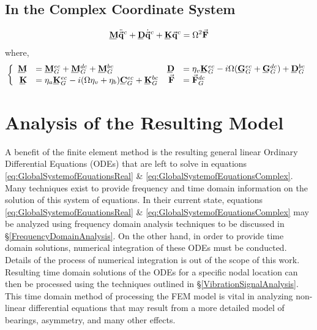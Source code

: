 \subsection{In the Complex Coordinate System}
\begin{equation}\label{eq:GlobalSystemofEquationsComplex}
\bunderline{\mathbf{M}}\ddot{\vec{\mathbf{q}}}^c+\bunderline{\mathbf{D}}\dot{\vec{\mathbf{q}}}^c+\bunderline{\mathbf{K}}\vec{\mathbf{q}}^c=\Omega^2\vec{\mathbf{F}}
\end{equation}
where,
\begin{equation*}
\left\{\begin{array}{rlrl}
\bunderline{\mathbf{M}}&=\bunderline{\mathbf{M}}^{ec}_G+\bunderline{\mathbf{M}}^{dc}_G+\bunderline{\mathbf{M}}^{bc}_G&\bunderline{\mathbf{D}}&=\eta_v\bunderline{\mathbf{K}}^{ec}_G-i\Omega(\bunderline{\mathbf{G}}^{ec}_G+\bunderline{\mathbf{G}}^{dc}_G)+\bunderline{\mathbf{D}}^{bc}_G\\
\bunderline{\mathbf{K}}&=\eta_a\bunderline{\mathbf{K}}^{ec}_G-i(\Omega\eta_v+\eta_b)\bunderline{\mathbf{C}}^{ec}_G+\bunderline{\mathbf{K}}^{bc}_G&\vec{\mathbf{F}}&=\vect{F}^{dc}_G
\end{array}\right.
\end{equation*}
\section{Analysis of the Resulting Model}
A benefit of the finite element method is the resulting general linear Ordinary Differential Equations (ODEs) that are left to solve in equations \eqref{eq:GlobalSystemofEquationsReal} \& \eqref{eq:GlobalSystemofEquationsComplex}. Many techniques exist to provide frequency and time domain information on the solution of this system of equations. In their current state, equations \eqref{eq:GlobalSystemofEquationsReal} \& \eqref{eq:GlobalSystemofEquationsComplex} may be analyzed using frequency domain analysis techniques to be discussed in \S\ref{FrequencyDomainAnalysis}. On the other hand, in order to provide time domain solutions, numerical integration of these ODEs must be conducted. Details of the process of numerical integration is out of the scope of this work. Resulting time domain solutions of the ODEs for a specific nodal location can then be processed using the techniques outlined in \S\ref{VibrationSignalAnalysis}. This time domain method of processing the FEM model is vital in analyzing non-linear differential equations that may result from a more detailed model of bearings, asymmetry, and many other effects.\par